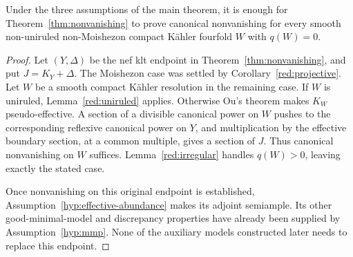 \begin{proposition}\label{red:reduction}
Under the three assumptions of the main theorem, it is enough for
Theorem~\ref{thm:nonvanishing} to prove canonical nonvanishing for every
smooth non-uniruled non-Moishezon compact Kähler fourfold \(W\) with
\(q(W)=0\).
\end{proposition}

\begin{proof}
Let \((Y,\Delta)\) be the nef klt endpoint in
Theorem~\ref{thm:nonvanishing}, and put \(J=K_Y+\Delta\). The
Moishezon case was settled by Corollary~\ref{red:projective}. Let
\(W\) be a smooth compact Kähler resolution in the remaining case.
If \(W\) is uniruled, Lemma~\ref{red:uniruled} applies. Otherwise
Ou's theorem makes \(K_W\) pseudo-effective. A section of a divisible
canonical power on \(W\) pushes to the corresponding reflexive
canonical power on \(Y\), and multiplication by the effective boundary
section, at a common multiple, gives a section of \(J\). Thus canonical
nonvanishing on \(W\) suffices. Lemma~\ref{red:irregular} handles
\(q(W)>0\), leaving exactly the stated case.

Once nonvanishing on this original endpoint is established,
Assumption~\ref{hyp:effective-abundance} makes its adjoint semiample.
Its other good-minimal-model and discrepancy properties have already
been supplied by Assumption~\ref{hyp:mmp}. None of the auxiliary
models constructed later needs to replace this endpoint.
\end{proof}
